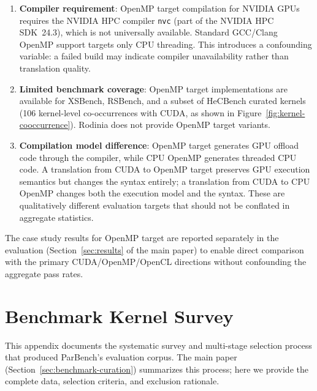 \begin{enumerate}
  \item \textbf{Compiler requirement}: OpenMP target compilation for NVIDIA GPUs
    requires the NVIDIA HPC compiler \texttt{nvc} (part of the NVIDIA HPC
    SDK~24.3), which is not universally available. Standard GCC/Clang OpenMP
    support targets only CPU threading. This introduces a confounding variable: a
    failed build may indicate compiler unavailability rather than translation
    quality.

  \item \textbf{Limited benchmark coverage}: OpenMP target implementations are
    available for XSBench, RSBench, and a subset of HeCBench curated kernels
    (106 kernel-level co-occurrences with CUDA, as shown in
    Figure~\ref{fig:kernel-cooccurrence}). Rodinia does not provide OpenMP target
    variants.

  \item \textbf{Compilation model difference}: OpenMP target generates GPU
    offload code through the compiler, while CPU OpenMP generates threaded CPU
    code. A translation from CUDA to OpenMP target preserves GPU execution
    semantics but changes the syntax entirely; a translation from CUDA to CPU
    OpenMP changes both the execution model and the syntax. These are
    qualitatively different evaluation targets that should not be conflated in
    aggregate statistics.
\end{enumerate}

The case study results for OpenMP target are reported separately in the
evaluation (Section~\ref{sec:results} of the main paper) to enable direct comparison with the
primary CUDA/OpenMP/OpenCL directions without confounding the aggregate pass
rates.



\section{Benchmark Kernel Survey}
\label{sec:appendix-b}

This appendix documents the systematic survey and multi-stage selection process
that produced ParBench's evaluation corpus. The main paper (Section~\ref{sec:benchmark-curation})
summarizes this process; here we provide the complete data, selection criteria,
and exclusion rationale.

